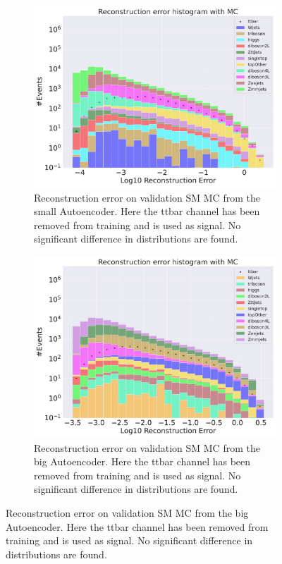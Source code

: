 \begin{figure}[h!]
    \centering
    \begin{subfigure}{.45\textwidth}
        \includegraphics[width=\textwidth]{Figures/AE_testing/small/b_data_recon_big_rm3_feats_sig_ttbar.pdf}
        \caption{Reconstruction error on validation SM MC from the small Autoencoder. Here the ttbar channel has been removed from training and 
        is used as signal. No significant difference in distributions are found. }
        \label{fig:ae_small_ttbar}
    \end{subfigure}
    \hfill 
    \begin{subfigure}{.45\textwidth}
        \includegraphics[width=\textwidth]{Figures/AE_testing/big/b_data_recon_big_rm3_feats_sig_ttbar.pdf}
        \caption{Reconstruction error on validation SM MC from the big Autoencoder. Here the ttbar channel has been removed from training and 
        is used as signal. No significant difference in distributions are found. }
        \label{fig:ae_big_ttbar}
    \end{subfigure}
    \hfill 
    \label{fig:ae_big_channel_3}
\end{figure}



